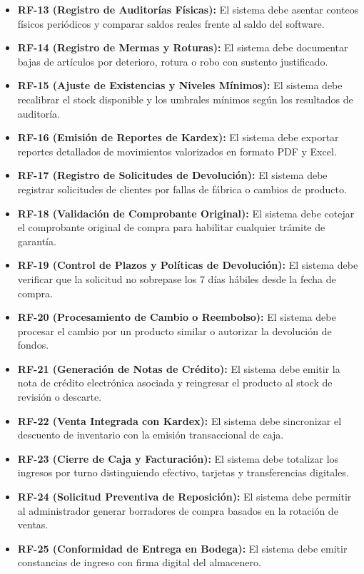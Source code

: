 \documentclass[12pt,a4paper]{article}
\begin{document}
\begin{itemize}
  \item \textbf{RF-13 (Registro de Auditorías Físicas):} El sistema debe asentar conteos físicos periódicos y comparar saldos reales frente al saldo del software.
  \item \textbf{RF-14 (Registro de Mermas y Roturas):} El sistema debe documentar bajas de artículos por deterioro, rotura o robo con sustento justificado.
  \item \textbf{RF-15 (Ajuste de Existencias y Niveles Mínimos):} El sistema debe recalibrar el stock disponible y los umbrales mínimos según los resultados de auditoría.
  \item \textbf{RF-16 (Emisión de Reportes de Kardex):} El sistema debe exportar reportes detallados de movimientos valorizados en formato PDF y Excel.
  \item \textbf{RF-17 (Registro de Solicitudes de Devolución):} El sistema debe registrar solicitudes de clientes por fallas de fábrica o cambios de producto.
  \item \textbf{RF-18 (Validación de Comprobante Original):} El sistema debe cotejar el comprobante original de compra para habilitar cualquier trámite de garantía.
  \item \textbf{RF-19 (Control de Plazos y Políticas de Devolución):} El sistema debe verificar que la solicitud no sobrepase los 7 días hábiles desde la fecha de compra.
  \item \textbf{RF-20 (Procesamiento de Cambio o Reembolso):} El sistema debe procesar el cambio por un producto similar o autorizar la devolución de fondos.
  \item \textbf{RF-21 (Generación de Notas de Crédito):} El sistema debe emitir la nota de crédito electrónica asociada y reingresar el producto al stock de revisión o descarte.
  \item \textbf{RF-22 (Venta Integrada con Kardex):} El sistema debe sincronizar el descuento de inventario con la emisión transaccional de caja.
  \item \textbf{RF-23 (Cierre de Caja y Facturación):} El sistema debe totalizar los ingresos por turno distinguiendo efectivo, tarjetas y transferencias digitales.
  \item \textbf{RF-24 (Solicitud Preventiva de Reposición):} El sistema debe permitir al administrador generar borradores de compra basados en la rotación de ventas.
  \item \textbf{RF-25 (Conformidad de Entrega en Bodega):} El sistema debe emitir constancias de ingreso con firma digital del almacenero.

\end{itemize}
\end{document}
